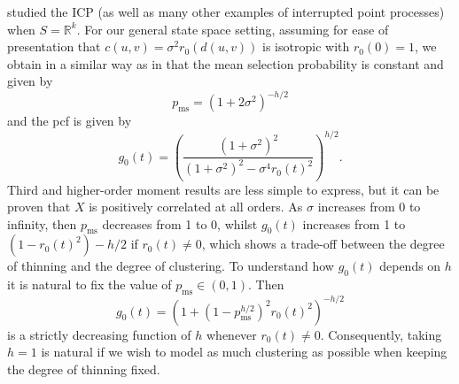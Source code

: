 \documentclass[alpha-refs]{wiley-article}
\begin{document}
\citet{FredMe} studied the ICP (as well as many other examples of interrupted point processes) when $S=\mathbb R^k$. For our general state space setting, assuming for ease of presentation that $c(u,v)=\sigma^2r_0(d(u,v))$ is isotropic with $r_0(0)=1$, we obtain in a similar way as in \citet{FredMe} that the mean selection probability is constant and given by
\begin{equation}\label{e:pms}
p_{\mathrm{ms}}=(1+2\sigma^2)^{-h/2}
\end{equation}
and the pcf is given by
\begin{equation}\label{e:g0ICP}
g_0(t)=\left(\frac{(1+\sigma^2)^2}{(1+\sigma^2)^2-\sigma^4 r_0(t)^2}\right)^{h/2}.
\end{equation}
Third and higher-order moment results are less simple to express, but it can be proven that $X$ is positively correlated at all orders.
As $\sigma$ increases from 0 to infinity, then $p_{\mathrm{ms}}$ decreases from 1 to 0, whilst $g_0(t)$ increases from 1 to $(1-r_0(t)^2)-{h/2}$
if $r_0(t)\not=0$, which shows a trade-off between the degree of thinning and the degree of clustering. 
To understand how $g_0(t)$ depends on $h$ it
 is natural to fix the value of $p_{\mathrm{ms}}\in(0,1)$. 
   Then
  \[g_0(t)=\left(1+\left(1-p_{\mathrm{ms}}^{h/2}\right)^2r_0(t)^2\right)^{-h/2}\]
  is a strictly decreasing function of $h$ whenever $r_0(t)\not=0$.
Consequently, taking $h=1$ is natural if we wish to model as much clustering as possible when keeping the degree of thinning fixed. 
\end{document}
